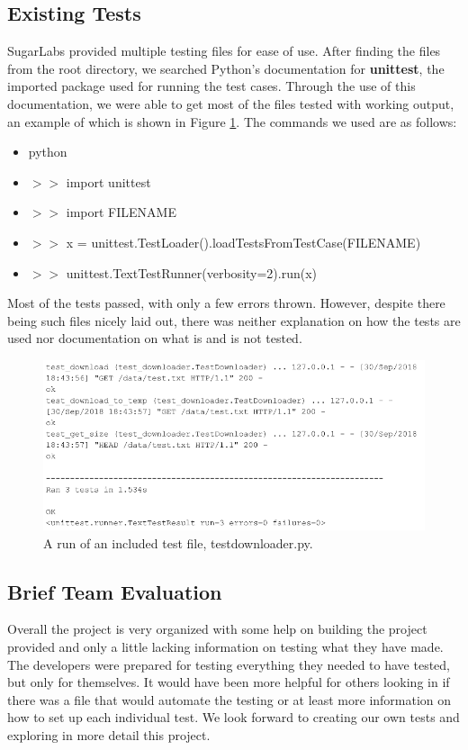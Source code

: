 \documentclass{article}
\begin{document}
\subsection{Existing Tests}
SugarLabs provided multiple testing files for ease of use. After finding the files from the root directory, we searched Python's documentation for \textbf{unittest}, the imported package used for running the test cases. Through the use of this documentation, we were able to get most of the files tested with working output, an example of which is shown in Figure \ref{Figure1}. The commands we used are as follows:
\begin{itemize}
\itemsep-0.5em
\item[] python
\item[] $>>$ import unittest
\item[] $>>$ import FILENAME
\item[] $>>$ x = unittest.TestLoader().loadTestsFromTestCase(FILENAME)
\item[] $>>$ unittest.TextTestRunner(verbosity=2).run(x)
\end{itemize}

Most of the tests passed, with only a few errors thrown. However, despite there being such files nicely laid out, there was neither explanation on how the tests are used nor documentation on what is and is not tested.
\begin{figure}
\centering
\includegraphics[scale=0.5]{../imgs/Figure1.png}
\caption{A run of an included test file, test\textunderscore downloader.py.}
\label{Figure1}
\end{figure}
\subsection{Brief Team Evaluation}
Overall the project is very organized with some help on building the project provided and only a little lacking information on testing what they have made. The developers were prepared for testing everything they needed to have tested, but only for themselves. It would have been more helpful for others looking in if there was a file that would automate the testing or at least more information on how to set up each individual test. We look forward to creating our own tests and exploring in more detail this project.
\end{document}
